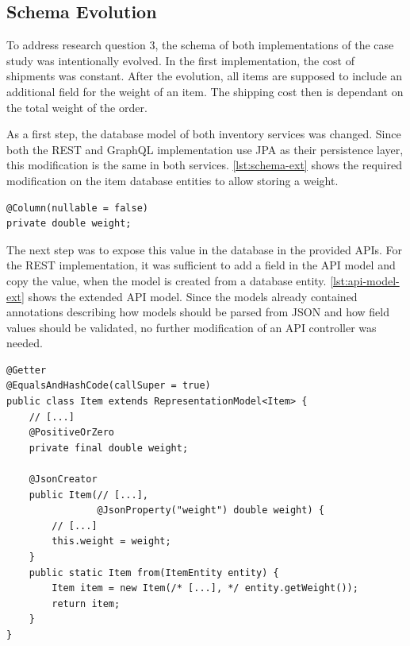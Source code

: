 \subsection{Schema Evolution}

To address research question 3, the schema of both implementations of the case study was intentionally evolved.
In the first implementation, the cost of shipments was constant.
After the evolution, all items are supposed to include an additional field for the weight of an item.
The shipping cost then is dependant on the total weight of the order.

As a first step, the database model of both inventory services was changed.
Since both the \ac{REST} and GraphQL implementation use \ac{JPA} as their persistence layer, this modification is the same in both services.
\autoref{lst:schema-ext} shows the required modification on the item database entities to allow storing a weight.

\begin{lstlisting}[style=java-ext, caption=Extended Database Schema of Items, label=lst:schema-ext]
@Column(nullable = false)
private double weight;
\end{lstlisting}

The next step was to expose this value in the database in the provided \acp{API}.
For the \ac{REST} implementation, it was sufficient to add a field in the \ac{API} model and copy the value, when the model is created from a database entity.
\autoref{lst:api-model-ext} shows the extended \ac{API} model.
Since the models already contained annotations describing how models should be parsed from \ac{JSON} and how field values should be validated, no further modification of an \ac{API} controller was needed.

\begin{lstlisting}[style=java-ext, caption=Extended \ac{API} Model for Items in the \ac{REST} Inventory Microservice, label=lst:api-model-ext]
@Getter
@EqualsAndHashCode(callSuper = true)
public class Item extends RepresentationModel<Item> {
    // [...]
    @PositiveOrZero
    private final double weight;
    
    @JsonCreator
    public Item(// [...],
                @JsonProperty("weight") double weight) {
        // [...]
        this.weight = weight;
    }
    public static Item from(ItemEntity entity) {
        Item item = new Item(/* [...], */ entity.getWeight());
        return item;
    }
}
\end{lstlisting}

